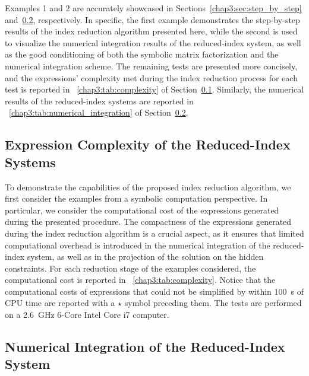%
Examples 1 and 2 are accurately showcased in Sections~\ref{chap3:sec:step_by_step} and~\ref{chap3:sec:numerical_integration}, respectively. In specific, the first example demonstrates the step-by-step results of the index reduction algorithm presented here, while the second is used to visualize the numerical integration results of the reduced-index system, as well as the good conditioning of both the symbolic matrix factorization and the numerical integration scheme. The remaining tests are presented more concisely, and the expressions' complexity met during the index reduction process for each test is reported in \tablename{}~\ref{chap3:tab:complexity} of Section~\ref{chap3:sec:daes_complexity}. Similarly, the numerical results of the reduced-index systems are reported in \tablename{}~\ref{chap3:tab:numerical_integration} of Section~\ref{chap3:sec:numerical_integration}.

\subsection{Expression Complexity of the Reduced-Index Systems}
\label{chap3:sec:daes_complexity}

To demonstrate the capabilities of the proposed index reduction algorithm, we first consider the examples from a symbolic computation perspective. In particular, we consider the computational cost of the expressions generated during the presented procedure. The compactness of the expressions generated during the index reduction algorithm is a crucial aspect, as it ensures that limited computational overhead is introduced in the numerical integration of the reduced-index system, as well as in the projection of the solution on the hidden constraints. For each reduction stage of the examples considered, the computational cost is reported in \tablename{}~\ref{chap3:tab:complexity}. Notice that the computational costs of expressions that could not be simplified by \Maple{} within \SI{100}{\second} of CPU time are reported with a $\star$ symbol preceding them. The tests are performed on a \SI{2.6}{\giga\hertz} 6-Core Intel\textsuperscript{\textregistered} Core\textsuperscript{\textregistered} i7 computer.


\subsection{Numerical Integration of the Reduced-Index System}
\label{chap3:sec:numerical_integration}

